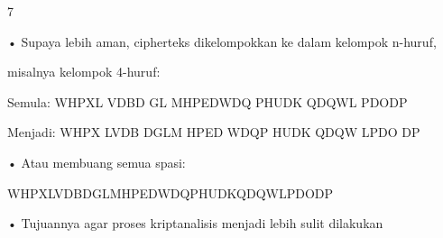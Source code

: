 \documentclass{article}
\begin{document}

7

• Supaya lebih aman, cipherteks dikelompokkan ke dalam kelompok n-huruf, 

misalnya kelompok 4-huruf:

 Semula:  WHPXL VDBD GL MHPEDWDQ PHUDK QDQWL PDODP

 Menjadi: WHPX LVDB DGLM HPED WDQP HUDK QDQW LPDO DP 

• Atau membuang semua spasi:


WHPXLVDBDGLMHPEDWDQPHUDKQDQWLPDODP

• Tujuannya agar proses kriptanalisis menjadi lebih sulit dilakukan
\end{document}
